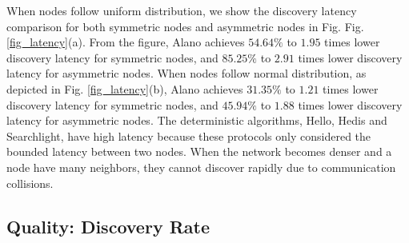 When nodes follow uniform distribution, we show the discovery latency comparison for both symmetric nodes and asymmetric nodes in Fig. Fig. \ref{fig_latency}(a).
From the figure, Alano achieves $54.64\%$ to $1.95$ times lower discovery latency for symmetric nodes, and $85.25\%$ to $2.91$ times lower discovery latency for asymmetric nodes.
When nodes follow normal distribution, as depicted in Fig. \ref{fig_latency}(b), 
Alano achieves $31.35\%$ to $1.21$ times lower discovery latency for symmetric nodes, and $45.94\%$ to $1.88$ times lower discovery latency for asymmetric nodes.
The deterministic algorithms, Hello, Hedis and Searchlight, have high latency because these protocols only considered the bounded latency between two nodes. When the network becomes denser and a node have many neighbors, they cannot discover rapidly due to communication collisions.


\subsection{Quality: Discovery Rate}





